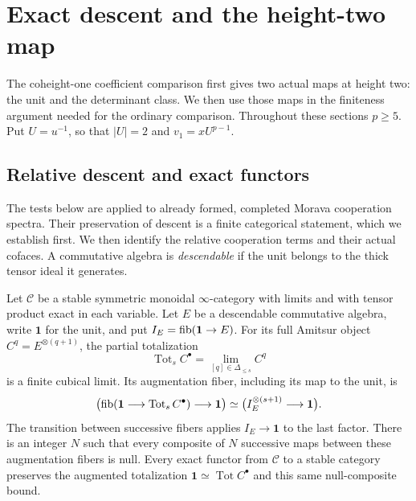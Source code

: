 \section{Exact descent and the height-two map}\label{h3:sec:descent}

The coheight-one coefficient comparison first gives two actual maps at
height two: the unit and the determinant class.  We then use those maps
in the finiteness argument needed for the ordinary comparison.
Throughout these sections \(p\geq5\).  Put \(U=u^{-1}\), so that
\(|U|=2\) and \(v_1=xU^{p-1}\).

\subsection{Relative descent and exact functors}

The tests below are applied to already formed, completed Morava
cooperation spectra.  Their preservation of descent is a finite
categorical statement, which we establish first.  We then identify the
relative cooperation terms and their actual cofaces.
A commutative algebra is \emph{descendable} if the unit belongs to the
thick tensor ideal it generates.

\begin{lemma}\label{h3:lem:exact-amitsur}
Let $\mathcal C$ be a stable symmetric monoidal $\infty$-category with
limits and with tensor product exact in each variable.  Let $E$ be a
descendable commutative algebra, write $\mathbf1$ for the unit, and put
$I_E=\operatorname{fib}(\mathbf1\to E)$.  For its full Amitsur object
$C^q=E^{\otimes(q+1)}$, the partial totalization
\[
 \operatorname{Tot}_s C^\bullet
   =\lim_{[q]\in\Delta_{\leq s}}C^q
\]
is a finite cubical limit.  Its augmentation fiber, including its map
to the unit, is
\begin{equation}\label{h3:des:partial-amitsur-fiber}
 \bigl(\operatorname{fib}(\mathbf1\longrightarrow\operatorname{Tot}_s C^\bullet)
       \longrightarrow\mathbf1\bigr)
 \simeq \bigl(I_E^{\otimes(s+1)}\longrightarrow\mathbf1\bigr).
\end{equation}
The transition between successive fibers applies $I_E\to\mathbf1$
to the last factor.  There is an integer $N$ such that every composite
of $N$ successive maps between these augmentation fibers is null.
Every exact functor from
$\mathcal C$ to a stable category preserves the augmented
totalization $\mathbf1\simeq\operatorname{Tot}C^\bullet$ and this
same null-composite bound.
\end{lemma}

